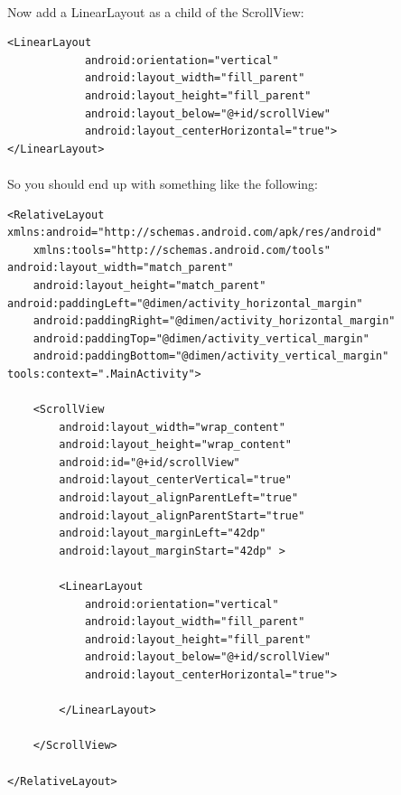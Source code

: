 \documentclass[12pt, a4paper, twoside]{book}
\begin{document}
\paragraph{} Now add a LinearLayout as a child of the ScrollView:

\begin{lstlisting}
<LinearLayout
            android:orientation="vertical"
            android:layout_width="fill_parent"
            android:layout_height="fill_parent"
            android:layout_below="@+id/scrollView"
            android:layout_centerHorizontal="true">
</LinearLayout>
\end{lstlisting}

\paragraph{} So you should end up with something like the following:

\begin{lstlisting}
<RelativeLayout xmlns:android="http://schemas.android.com/apk/res/android"
    xmlns:tools="http://schemas.android.com/tools" android:layout_width="match_parent"
    android:layout_height="match_parent" android:paddingLeft="@dimen/activity_horizontal_margin"
    android:paddingRight="@dimen/activity_horizontal_margin"
    android:paddingTop="@dimen/activity_vertical_margin"
    android:paddingBottom="@dimen/activity_vertical_margin" tools:context=".MainActivity">

    <ScrollView
        android:layout_width="wrap_content"
        android:layout_height="wrap_content"
        android:id="@+id/scrollView"
        android:layout_centerVertical="true"
        android:layout_alignParentLeft="true"
        android:layout_alignParentStart="true"
        android:layout_marginLeft="42dp"
        android:layout_marginStart="42dp" >

        <LinearLayout
            android:orientation="vertical"
            android:layout_width="fill_parent"
            android:layout_height="fill_parent"
            android:layout_below="@+id/scrollView"
            android:layout_centerHorizontal="true">

        </LinearLayout>

    </ScrollView>

</RelativeLayout>
\end{lstlisting}
\end{document}
